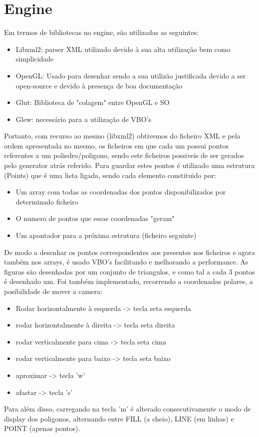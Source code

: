 \documentclass{article}
\begin{document}
\section{Engine}
Em termos de bibliotecas no engine, são utilizadas as seguintes:
\begin{itemize}
    \item Libxml2: parser XML utilizado devido à sua alta utilização bem como simplicidade
    \item OpenGL: Usado para desenhar sendo a sua utilizão justificada devido a ser open-source e devido à presença de boa documentação
    \item Glut: Biblioteca de "colagem" entre OpenGL e SO
    \item Glew: necessário para a utilização de VBO's
\end{itemize}
Portanto, com recurso ao mesmo (libxml2) obtivemos do ficheiro XML e pela ordem apresentada no mesmo, os ficheiros em que cada um possui pontos referentes a um poliedro/poligono, sendo este ficheiros possiveis de ser gerados pelo generator atrás referido. 
Para guardar estes pontos é utilizado uma estrutura (Points) que é uma lista ligada, sendo cada elemento constituido por:
\begin{itemize}
    \item Um array com todas as coordenadas dos pontos disponibilizados por determinado ficheiro
    \item O numero de pontos que essas coordenadas "geram"
    \item Um apontador para a próxima estrutura (ficheiro seguinte)
\end{itemize}
De modo a desenhar os pontos correspondentes aos presentes nos ficheiros e agora também nos arrays, é usado VBO's facilitando e melhorando a performance. As figuras são desenhadas por um conjunto de triangulos, e como tal a cada 3 pontos é desenhado um. 
Foi também implementado, recorrendo a coordenadas polares, a posibilidade de mover a camera:
\begin{itemize}
    \item Rodar horizontalmente à esquerda -> tecla seta esquerda
    \item rodar horizontalmente à direita -> tecla seta direita
    \item rodar verticalmente para cima -> tecla seta cima
    \item rodar verticalmente para baixo -> tecla seta baixo
    \item aproximar -> tecla 'w'
    \item afastar -> tecla 's'
\end{itemize}
Para além disso, carregando na tecla 'm' é alterado consecutivamente o modo de display dos poligonos, alternando entre FILL (a cheio), LINE (em linhas) e POINT (apenas pontos).
\end{document}
